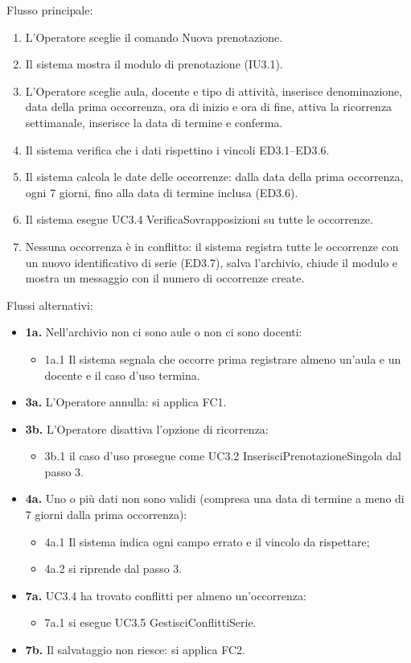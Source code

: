 \noindent Flusso principale:
\begin{enumerate}
\item L'Operatore sceglie il comando Nuova prenotazione.
\item Il sistema mostra il modulo di prenotazione (IU3.1).
\item L'Operatore sceglie aula, docente e tipo di attività, inserisce denominazione, data della prima occorrenza, ora di inizio e ora di fine, attiva la ricorrenza settimanale, inserisce la data di termine e conferma.
\item Il sistema verifica che i dati rispettino i vincoli ED3.1–ED3.6.
\item Il sistema calcola le date delle occorrenze: dalla data della prima occorrenza, ogni 7 giorni, fino alla data di termine inclusa (ED3.6).
\item Il sistema esegue UC3.4 VerificaSovrapposizioni su tutte le occorrenze.
\item Nessuna occorrenza è in conflitto: il sistema registra tutte le occorrenze con un nuovo identificativo di serie (ED3.7), salva l'archivio, chiude il modulo e mostra un messaggio con il numero di occorrenze create.
\end{enumerate}
\noindent Flussi alternativi:
\begin{itemize}
\item \textbf{1a.} Nell'archivio non ci sono aule o non ci sono docenti:
\begin{itemize}
\item 1a.1 Il sistema segnala che occorre prima registrare almeno un'aula e un docente e il caso d'uso termina.
\end{itemize}
\item \textbf{3a.} L'Operatore annulla: si applica FC1.
\item \textbf{3b.} L'Operatore disattiva l'opzione di ricorrenza:
\begin{itemize}
\item 3b.1 il caso d'uso prosegue come UC3.2 InserisciPrenotazioneSingola dal passo 3.
\end{itemize}
\item \textbf{4a.} Uno o più dati non sono validi (compresa una data di termine a meno di 7 giorni dalla prima occorrenza):
\begin{itemize}
\item 4a.1 Il sistema indica ogni campo errato e il vincolo da rispettare;
\item 4a.2 si riprende dal passo 3.
\end{itemize}
\item \textbf{7a.} UC3.4 ha trovato conflitti per almeno un'occorrenza:
\begin{itemize}
\item 7a.1 si esegue UC3.5 GestisciConflittiSerie.
\end{itemize}
\item \textbf{7b.} Il salvataggio non riesce: si applica FC2.
\end{itemize}

